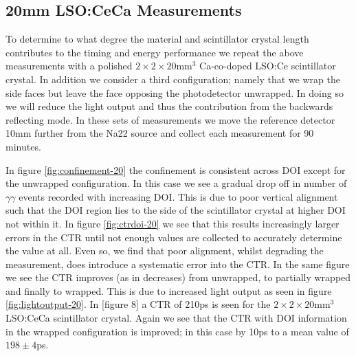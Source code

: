 \subsection{20mm LSO:CeCa Measurements}
To determine to what degree the material and scintillator crystal length contributes to the timing and energy performance we repeat the above measurements with a polished $2\times2\times20$mm$^3$ Ca-co-doped LSO:Ce scintillator crystal. In addition we consider a third configuration; namely that we wrap the side faces but leave the face opposing the photodetector unwrapped. In doing so we will reduce the light output and thus the contribution from the backwards reflecting mode. In these sets of measurements we move the reference detector 10mm further from the Na22 source and collect each measurement for 90 minutes.

In figure \ref{fig:confinement-20} the confinement is consistent across DOI except for the unwrapped configuration. In this case we see a gradual drop off in number of $\gamma\gamma$ events recorded with increasing DOI. This is due to poor vertical alignment such that the DOI region lies to the side of the scintillator crystal at higher DOI not within it. In figure \ref{fig:ctrdoi-20} we see that this results increasingly larger errors in the CTR until not enough values are collected to accurately determine the value at all. Even so, we find that poor alignment, whilst degrading the measurement, does introduce a systematic error into the CTR. In the same figure we see the CTR improves (as in decreases) from unwrapped, to partially wrapped and finally to wrapped. This is due to increased light output as seen in figure \ref{fig:lightoutput-20}. In [figure 8] \cite{r_Paganoni_Pauwels_et_al__2011} a CTR of 210ps is seen for the $2\times2\times20$mm$^3$ LSO:CeCa scintillator crystal. Again we see that the CTR with DOI information in the wrapped configuration is improved; in this case by 10ps to a mean value of $198\pm4$ps.